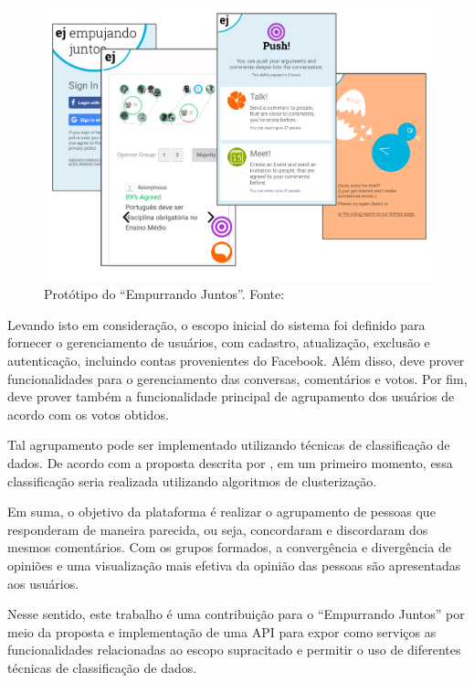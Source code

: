 \begin{figure}[h!]
\centering
\includegraphics[scale=0.3]{figuras/prototipo.png}
\caption{Protótipo do ``Empurrando Juntos''. Fonte: \cite{parra}}
\label{fig:prototipo}
\end{figure}

Levando isto em consideração, o escopo inicial do sistema foi definido para fornecer o gerenciamento de usuários, com cadastro, atualização, exclusão e autenticação, 
incluindo contas provenientes do Facebook. Além disso, deve prover funcionalidades para o gerenciamento das conversas, comentários
e votos. Por fim, deve prover também a funcionalidade principal de agrupamento dos usuários de acordo com os votos obtidos.

Tal agrupamento pode ser implementado utilizando técnicas de classificação de dados.
De acordo com a proposta descrita por , 
em um primeiro momento, essa classificação seria realizada utilizando algoritmos de clusterização. 

Em suma, o objetivo da plataforma é realizar o agrupamento de pessoas que responderam de maneira parecida, ou seja, 
concordaram e discordaram dos mesmos comentários. Com os grupos formados, a convergência e divergência 
de opiniões e uma visualização mais efetiva da opinião das pessoas são apresentadas aos usuários. 

Nesse sentido, este trabalho 
é uma contribuição para o ``Empurrando Juntos'' por meio da proposta e implementação de uma API para expor como serviços as funcionalidades
relacionadas ao escopo supracitado e permitir o uso de diferentes técnicas 
de classificação de dados.


